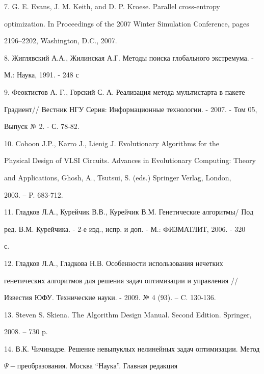 \documentclass [12pt]{article}
\begin{document}
{7. G. E. Evans, J. M. Keith, and D. P. Kroese. Parallel cross-entropy 

optimization. In Proceedings of the 2007 Winter Simulation Conference, pages 

2196--2202, Washington, D.C., 2007.



8. Жиглявский А.А., Жилинская А.Г. Методы поиска глобального экстремума. - 

М.: Наука, 1991. - 248 с



9. Феоктистов А. Г., Горский С. А. Реализация метода мультистарта в пакете 

Градиент// Вестник НГУ Серия: Информационные технологии. - 2007. - Том 05, 

Выпуск № 2. - С. 78-82. 



10. Cohoon J.P., Karro J., Lienig J. Evolutionary Algorithms for the 

Physical Design of VLSI Circuits. Advances in Evolutionary Computing: Theory 

and Applications, Ghosh, A., Tsutsui, S. (eds.) Springer Verlag, London, 

2003. -- P. 683-712. 



11. Гладков Л.А., Курейчик В.В., Курейчик В.М. Генетические алгоритмы/ Под 

ред. В.М. Курейчика. - 2-е изд., испр. и доп. - М.: ФИЗМАТЛИТ, 2006. - 320 

с. 



12. Гладков Л.А., Гладкова Н.В. Особенности использования нечетких 

генетических алгоритмов для решения задач оптимизации и управления // 

Известия ЮФУ. Технические науки. - 2009. № 4 (93). -- C. 130-136.











13. Steven S. Skiena. The Algorithm Design Manual. Second Edition. Springer, 

2008. -- 730 p.



14. В.К. Чичинадзе. Решение невыпуклых нелинейных задач оптимизации. Метод 

$\Psi - $преобразования. Москва ``Наука''. Главная редакция 

}
\end{document}
